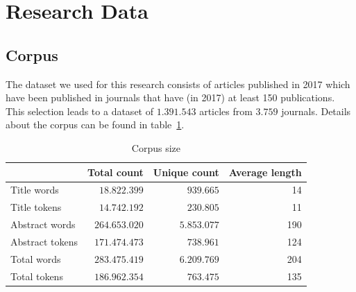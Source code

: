 \documentclass[../../Thesis.tex]{subfiles}
\begin{document}
\section{Research Data}
\subsection{Corpus}
The dataset we used for this research consists of articles published in 2017 which have been published in journals that have (in 2017) at least 150 publications. This selection leads to a dataset of $1.391.543$ articles from $3.759$ journals. Details about the corpus can be found in table~\ref{table:corpusSize}.
\FloatBarrier
\begin{table}[hbt]
\begin{center}
\begin{tabular}{|l|r|r|r|}
\hline
 & Total count & Unique count & Average length\footnotemark \\
\hline\hline
Title words & $18.822.399$ & $939.665$ & 14  \\
\hline
Title tokens & $14.742.192$ & $230.805$ & 11 \\
\hline\hline
Abstract words & $264.653.020$ & $5.853.077$  & 190  \\
\hline
Abstract tokens & $171.474.473$ & $738.961$ & 124 \\
\hline\hline
Total words & $283.475.419$ & $6.209.769$  & 204 \\
\hline
Total tokens & $186.962.354$ & $763.475$ & 135 \\
\hline
\end{tabular}
\end{center}
\caption{Corpus size}\label{table:corpusSize}
\end{table}
\FloatBarrier
{}
\end{document}
